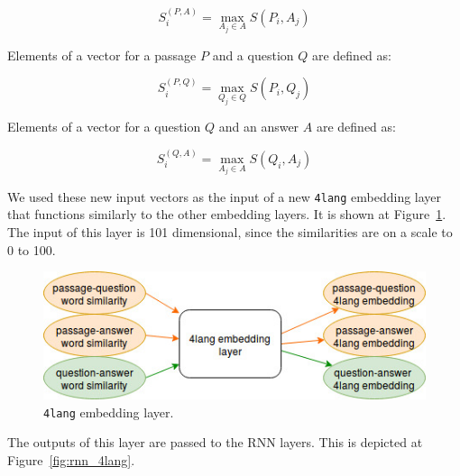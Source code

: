 \[S^{(P, A)}_i = \max_{A_j \in A} S(P_i, A_j)\]

Elements of a vector for a passage $P$ and a question $Q$ are defined as:

\[S^{(P, Q)}_i = \max_{Q_j \in Q} S(P_i, Q_j)\]

Elements of a vector for a question $Q$ and an answer $A$ are defined as:

\[S^{(Q, A)}_i = \max_{A_j \in A} S(Q_i, A_j)\]

We used these new input vectors as the input of a new \texttt{4lang} embedding layer that functions similarly to the other embedding layers. It is shown at Figure~\ref{fig:4lang_embedding}. The input of this layer is 101 dimensional, since the similarities are on a scale to 0 to 100.

\begin{figure}[h!]
	\centering
	\includegraphics[scale=0.5]{4lang_embedding.jpg}
	\caption{\texttt{4lang} embedding layer.}
	\label{fig:4lang_embedding}
\end{figure}

The outputs of this layer are passed to the RNN layers. This is depicted at Figure~\ref{fig:rnn_4lang}.

